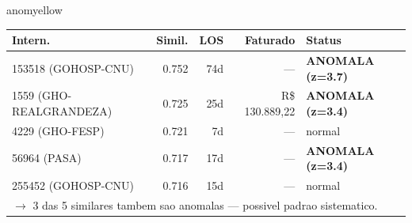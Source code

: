 \documentclass[a4paper,10pt]{article}
\begin{document}
\begin{anomalycard}[Internacao 261907 | GOHOSP-CNU | MODERADO (z=2.69)]{anomyellow}
\begin{tabular}{l r r r l}\toprule\textbf{Intern.} & \textbf{Simil.} & \textbf{LOS} & \textbf{Faturado} & \textbf{Status} \\\midrule
153518 (GOHOSP-CNU) & 0.752 & 74d & --- & \textcolor{anomred}{\textbf{ANOMALA (z=3.7)}} \\
1559 (GHO-REALGRANDEZA) & 0.725 & 25d & R\$ 130.889,22 & \textcolor{anomred}{\textbf{ANOMALA (z=3.4)}} \\
4229 (GHO-FESP) & 0.721 & 7d & --- & \textcolor{jcubeblue}{normal} \\
56964 (PASA) & 0.717 & 17d & --- & \textcolor{anomred}{\textbf{ANOMALA (z=3.4)}} \\
255452 (GOHOSP-CNU) & 0.716 & 15d & --- & \textcolor{jcubeblue}{normal} \\
\multicolumn{5}{l}{\textcolor{anomred}{\small $\rightarrow$ 3 das 5 similares tambem sao anomalas --- possivel padrao sistematico.}} \\
\bottomrule\end{tabular}


\end{anomalycard}

\newpage
\end{document}
